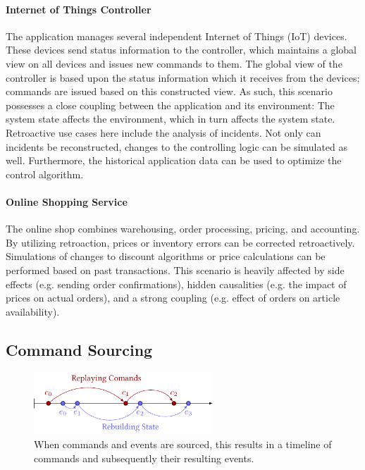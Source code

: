 \paragraph{Internet of Things Controller} 
	The application manages several independent Internet of Things (IoT) devices. 
	These devices send status information to the controller, which maintains a 
	global view on all devices and issues new commands to them.
	The global view of the controller is based upon the status information which 
	it receives from the devices; commands are issued based on this constructed view.
	As such, this scenario possesses a close coupling between the application and 
	its environment: 
	The system state affects the environment, which in turn affects the system state.
	Retroactive use cases here include the analysis of incidents.
	Not only can incidents be reconstructed, changes to the controlling logic can be 
	simulated as well. Furthermore, the historical application data can be used to
	optimize the control algorithm.

\paragraph{Online Shopping Service} 
	The online shop combines warehousing, order processing, pricing, and accounting. 
	By utilizing retroaction, prices or inventory errors can be corrected retroactively. 
	Simulations of changes to discount algorithms or price calculations can be performed 
	based on past transactions. This scenario is heavily affected by side effects (e.g. 
	sending order confirmations), hidden causalities (e.g. the impact of prices on actual 
	orders), and a strong coupling (e.g. effect of orders on article availability).

\subsection{Command Sourcing}
\begin{figure}
	\centering
	\includegraphics[width=0.6\textwidth]{../illustrations/event-log.pdf}
	\caption{
		When commands and events are sourced, this results in a timeline 
		of commands and subsequently their resulting events.
	}
	\label{fig:event-log}
\end{figure}

